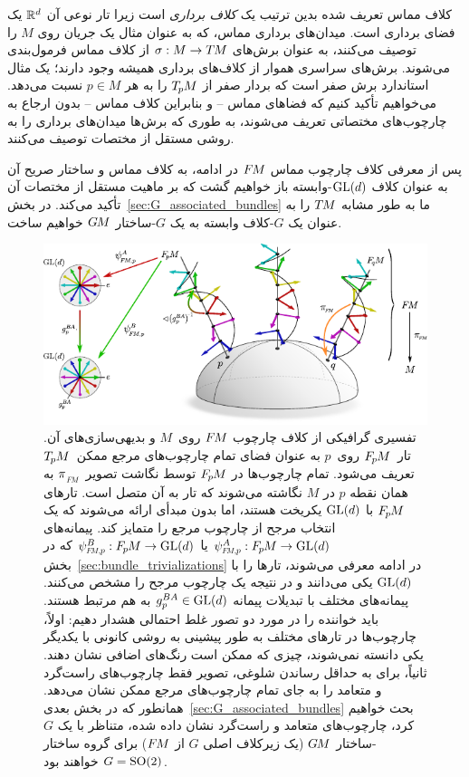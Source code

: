 کلاف مماس تعریف شده بدین ترتیب یک \emph{کلاف برداری} است زیرا تار نوعی آن $\mathbb{R}^d$ یک فضای برداری است.
میدان‌های برداری مماس، که به عنوان مثال یک جریان روی $M$ را توصیف می‌کنند، به عنوان برش‌های $\sigma: M\to T\mkern-1.5muM$ از کلاف مماس فرمول‌بندی می‌شوند.
برش‌های سراسری هموار از کلاف‌های برداری همیشه وجود دارند؛ یک مثال استاندارد برش صفر است که بردار صفر از $T_{\mkern-1.5mu p}\mkern-.5muM$ را به هر $p\in M$ نسبت می‌دهد.
می‌خواهیم تأکید کنیم که فضاهای مماس -- و بنابراین کلاف مماس -- بدون ارجاع به چارچوب‌های مختصاتی تعریف می‌شوند، به طوری که برش‌ها میدان‌های برداری را به روشی مستقل از مختصات توصیف می‌کنند.

پس از معرفی کلاف چارچوب مماس $F\mkern-1.5muM$ در ادامه، به کلاف مماس و ساختار صریح آن به عنوان کلاف $\operatorname{GL}(d)$-وابسته باز خواهیم گشت که بر ماهیت مستقل از مختصات آن تأکید می‌کند.
در بخش~\ref{sec:G_associated_bundles} ما به طور مشابه $T\mkern-1.5muM$ را به عنوان یک $G$-کلاف وابسته به یک $G$-ساختار $G\mkern-1.4muM$ خواهیم ساخت.


\begin{figure}
	\centering
	\includegraphics[width=1.\columnwidth]{figures/frame_bundle.pdf}
	\vspace*{-1ex}
	\caption{\small
		تفسیری گرافیکی از کلاف چارچوب $F\mkern-1.5muM$ روی~$M$ و بدیهی‌سازی‌های آن.
		تار~$F_{\mkern-1.5mu p}\mkern-1.0muM$ روی~$p$ به عنوان فضای تمام چارچوب‌های مرجع ممکن~$T_{\mkern-1.5mu p}\mkern-.5muM$ تعریف می‌شود.
		تمام چارچوب‌ها در $F_{\mkern-1.5mu p}\mkern-1.0muM$ توسط نگاشت تصویر $\piFM$ به همان نقطه $p$ در $M$ نگاشته می‌شوند که تار به آن متصل است.
		تارهای $F_{\mkern-1.5mu p}\mkern-1.0muM$ با $\operatorname{GL}(d)$ یکریخت هستند، اما بدون مبدأی ارائه می‌شوند که یک انتخاب مرجح از چارچوب مرجع را متمایز کند.
		پیمانه‌های $\psiFMp^A: \FpM \to \GL{d}$ یا $\psiFMp^B: \FpM \to \GL{d}$ که در بخش~\ref{sec:bundle_trivializations} در ادامه معرفی می‌شوند، تارها را با $\operatorname{GL}(d)$ یکی می‌دانند و در نتیجه یک چارچوب مرجح را مشخص می‌کنند.
		پیمانه‌های مختلف با تبدیلات پیمانه $g_p^{BA} \in \operatorname{GL}(d)$ به هم مرتبط هستند.
		باید خواننده را در مورد دو تصور غلط احتمالی هشدار دهیم:
		اولاً، چارچوب‌ها در تارهای مختلف به طور پیشینی به روشی کانونی با یکدیگر یکی دانسته نمی‌شوند، چیزی که ممکن است رنگ‌های اضافی نشان دهند.
		ثانیاً، برای به حداقل رساندن شلوغی، تصویر فقط چارچوب‌های راست‌گرد و متعامد را به جای تمام چارچوب‌های مرجع ممکن نشان می‌دهد.
		همانطور که در بخش بعدی~\ref{sec:G_associated_bundles} بحث خواهیم کرد، چارچوب‌های متعامد و راست‌گرد نشان داده شده، متناظر با یک $G$-ساختار $G\mkern-1.4muM$ (یک زیرکلاف اصلی $G$ از $F\mkern-1.5muM$) برای گروه ساختار $G=\operatorname{SO}(2)$ خواهند بود.
	}
	\label{fig:frame_bundle}
\end{figure}

